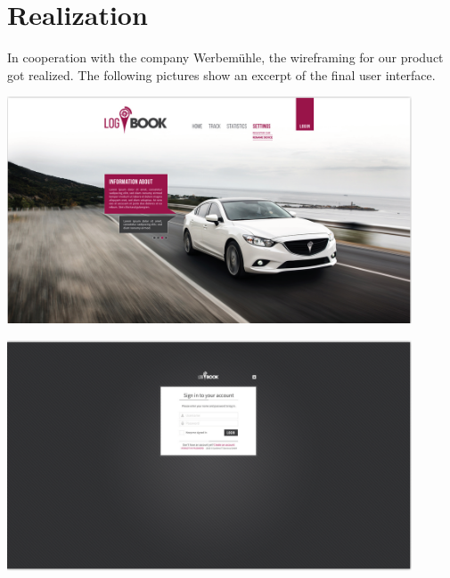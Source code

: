 \section{Realization}
In cooperation with the company Werbemühle, the wireframing for our product got realized. The following pictures show an excerpt of the final user interface.
\begin{center}
\includegraphics[width=0.9\textwidth]{bilder/wireframing22}
\end{center}
\begin{center}
\includegraphics[width=0.9\textwidth]{bilder/wireframing33}
\end{center}